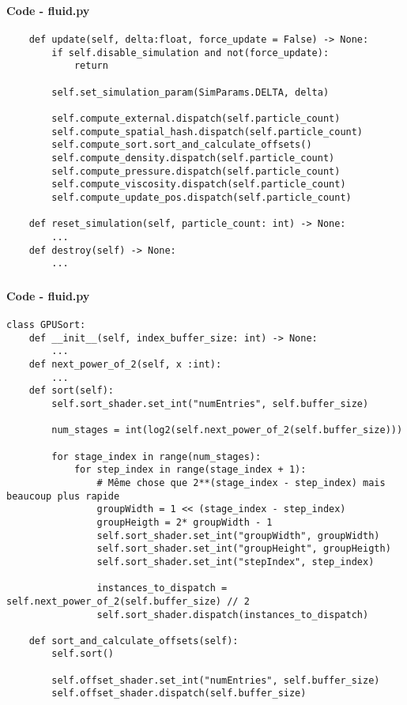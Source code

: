 \begin{frame}[fragile]
    \frametitle{\anxpti}
    \framesubtitle{Code - fluid.py}

    \begin{verbatim}
    def update(self, delta:float, force_update = False) -> None:
        if self.disable_simulation and not(force_update):
            return 
        
        self.set_simulation_param(SimParams.DELTA, delta)

        self.compute_external.dispatch(self.particle_count)
        self.compute_spatial_hash.dispatch(self.particle_count)
        self.compute_sort.sort_and_calculate_offsets()
        self.compute_density.dispatch(self.particle_count)
        self.compute_pressure.dispatch(self.particle_count)
        self.compute_viscosity.dispatch(self.particle_count)
        self.compute_update_pos.dispatch(self.particle_count)

    def reset_simulation(self, particle_count: int) -> None:
        ...
    def destroy(self) -> None:
        ...
    \end{verbatim}
\end{frame}


\begin{frame}[fragile]
    \frametitle{\anxpti}
    \framesubtitle{Code - fluid.py}

    \begin{verbatim}
class GPUSort:
    def __init__(self, index_buffer_size: int) -> None:
        ...
    def next_power_of_2(self, x :int):
        ...
    def sort(self):
        self.sort_shader.set_int("numEntries", self.buffer_size)
        
        num_stages = int(log2(self.next_power_of_2(self.buffer_size)))

        for stage_index in range(num_stages):
            for step_index in range(stage_index + 1):
                # Même chose que 2**(stage_index - step_index) mais beaucoup plus rapide
                groupWidth = 1 << (stage_index - step_index)
                groupHeigth = 2* groupWidth - 1
                self.sort_shader.set_int("groupWidth", groupWidth)
                self.sort_shader.set_int("groupHeight", groupHeigth)
                self.sort_shader.set_int("stepIndex", step_index)

                instances_to_dispatch = self.next_power_of_2(self.buffer_size) // 2
                self.sort_shader.dispatch(instances_to_dispatch)

    def sort_and_calculate_offsets(self):
        self.sort()

        self.offset_shader.set_int("numEntries", self.buffer_size)
        self.offset_shader.dispatch(self.buffer_size)
    \end{verbatim}
\end{frame}

